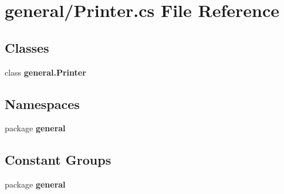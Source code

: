 \section{general/\-Printer.cs File Reference}
\label{_printer_8cs}
\subsection*{Classes}
\begin{DoxyCompactItemize}
\item 
class {\bf general.\-Printer}
\end{DoxyCompactItemize}
\subsection*{Namespaces}
\begin{DoxyCompactItemize}
\item 
package {\bf general}
\end{DoxyCompactItemize}
\subsection*{Constant Groups}
\begin{DoxyCompactItemize}
\item 
package {\bf general}
\end{DoxyCompactItemize}
